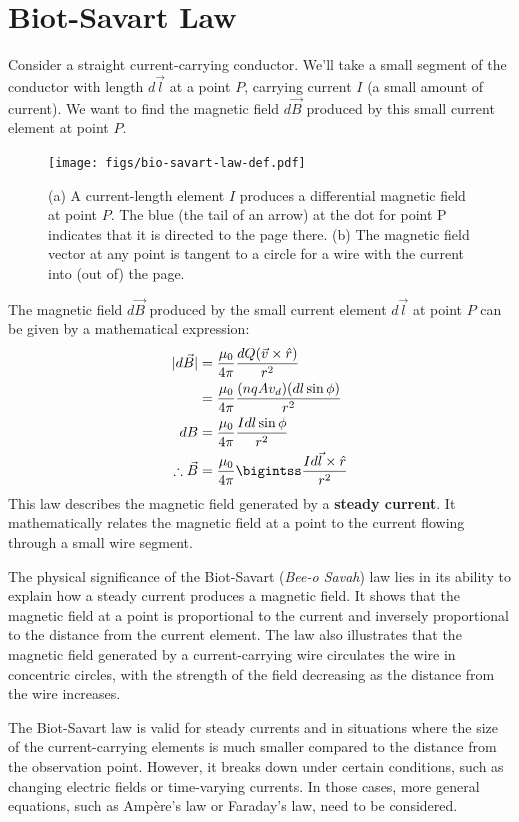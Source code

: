 \documentclass[12pt,b4paper]{article}
\begin{document}
\section{Biot-Savart Law}
Consider a straight current-carrying conductor. We'll take a small segment of the conductor with length $d\vec{l}$ at a point $P$, carrying current $I$ (a small amount of current). We want to find the magnetic field $d\vec{B}$ produced by this small current element at point $P$.
\begin{figure}[H]
    \centering
    \texttt{[image: figs/bio-savart-law-def.pdf]}
    \caption{(a) A current-length element $I$ produces a differential magnetic field at point $P$. The blue (the tail of an arrow) at the dot for point P indicates that it is directed to the page there. (b) The magnetic field vector at any point is tangent to a circle for a wire with the current into (out of) the page.}
    \label{fig:bio-savart-law-def}
\end{figure}
The magnetic field $d\vec{B}$ produced by the small current element $d\vec{l}$ at point 
$P$ can be given by a mathematical expression:
\begin{align}
    |d\vec{B}|&=\frac{\mu_0}{4\pi}\frac{dQ(\vec{v}\times\hat{r})}{r^2}\notag\\
    &=\frac{\mu_0}{4\pi}\frac{(nqAv_d)(dl\sin\phi)}{r^2}\notag\\
    dB&=\frac{\mu_0}{4\pi}\frac{Idl\sin\phi}{r^2}\\
    \therefore\vec{B}&=\frac{\mu_0}{4\pi}\bigintss\frac{Id\Vec{l}\times\hat{r}}{r^2}
\end{align}
This law describes the magnetic field generated by a \textbf{steady current}. It mathematically relates the magnetic field at a point to the current flowing through a small wire segment.

The physical significance of the Biot-Savart (\textit{Bee-o Savah}) law lies in its ability to explain how a steady current produces a magnetic field. It shows that the magnetic field at a point is proportional to the current and inversely proportional to the distance from the current element. The law also illustrates that the magnetic field generated by a current-carrying wire circulates the wire in concentric circles, with the strength of the field decreasing as the distance from the wire increases.

The Biot-Savart law is valid for steady currents and in situations where the size of the current-carrying elements is much smaller compared to the distance from the observation point. However, it breaks down under certain conditions, such as changing electric fields or time-varying currents. In those cases, more general equations, such as Ampère's law or Faraday's law, need to be considered.
\end{document}
